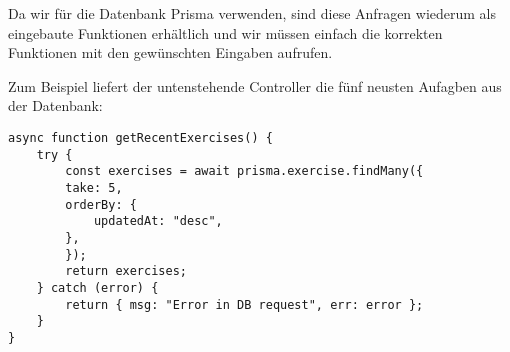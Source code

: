 Da wir für die Datenbank Prisma verwenden, sind diese Anfragen wiederum als eingebaute Funktionen erhältlich und wir müssen einfach die korrekten Funktionen mit den gewünschten Eingaben aufrufen. 

Zum Beispiel liefert der untenstehende Controller die fünf neusten Aufagben aus der Datenbank:

\begin{lstlisting}
async function getRecentExercises() {
    try {
        const exercises = await prisma.exercise.findMany({
        take: 5,
        orderBy: {
            updatedAt: "desc",
        },
        });
        return exercises;
    } catch (error) {
        return { msg: "Error in DB request", err: error };
    }
}
\end{lstlisting}


